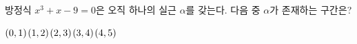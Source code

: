 방정식 $x^3+x-9=0$은 오직 하나의 실근 $\alpha$를 갖는다. 다음 중 $\alpha$가 존재하는 구간은?
\begin{choices32}{$(0{,}\mkern3mu\mathopen{}1)$}{$(1{,}\mkern3mu\mathopen{}2)$}{$(2{,}\mkern3mu\mathopen{}3)$}{$(3{,}\mkern3mu\mathopen{}4)$}{$(4{,}\mkern3mu\mathopen{}5)$}\end{choices32}
